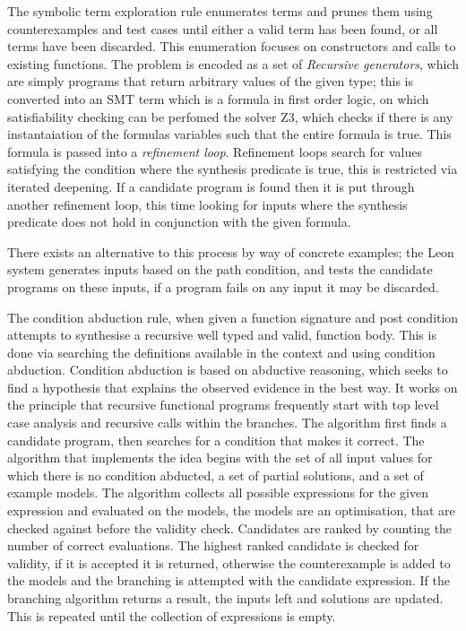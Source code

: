 \documentclass[a4paper]{article}
\begin{document}
The symbolic term exploration rule enumerates terms and prunes them using counterexamples and test cases until 
either a valid term has been found, or all terms have been discarded. This enumeration focuses on constructors and calls to 
existing functions. The problem is encoded as a set of \emph{Recursive generators}, which are simply programs that return arbitrary
values of the given type; this is converted into an SMT term which is a formula in first order logic, on which satisfiability checking can be perfomed the solver Z3, which checks if there is any instantaiation of the formulas variables such that the entire formula is true. This formula is passed into a \emph{refinement loop}.
Refinement loops search for values satisfying the condition where the synthesis predicate is true, this is restricted via iterated deepening. If a candidate program is found then it 
is put through another refinement loop, this time looking for inputs where the synthesis predicate does not hold in conjunction with the given formula. 

There exists an alternative to this process by way of concrete examples; the Leon system generates inputs 
based on the path condition, and tests the candidate programs on these inputs, if a program fails on any input it may be
discarded. 

The condition abduction rule, when given a function signature and post condition attempts to synthesise a recursive 
well typed and valid, function body. This is done via searching the definitions available in the context and using 
condition abduction. Condition abduction is based on abductive reasoning, which seeks to find a hypothesis that explains the 
observed evidence in the best way. It works on the principle that recursive functional programs frequently start with top 
level case analysis and recursive calls within the branches. The algorithm first finds a candidate program, then searches
for a condition that makes it correct. The algorithm that implements the idea begins with the set of all input values 
for which there is no condition abducted, a set of partial solutions, and a set of example models. The algorithm collects 
all possible expressions for the given expression and evaluated on the models, the models are an optimisation, that are 
checked against before the validity check. Candidates are ranked by counting the number of correct evaluations. The highest ranked candidate is checked 
for validity, if it is accepted it is returned, otherwise the counterexample is added to the models and the branching is 
attempted with the candidate expression. If the branching algorithm returns a result, the inputs left and solutions are
updated. This is repeated until the collection of expressions is empty. 
\end{document}
